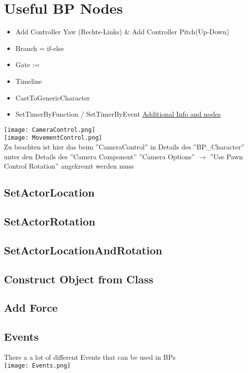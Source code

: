     \section{Useful BP Nodes}    
        \begin{itemize}
            \item Add Controller Yaw (Rechts-Links) \& Add Controller Pitch(Up-Down) 
            \item Branch = if-else
            \item Gate := 
            \item Timeline
            \item CastToGenericCharacter
            \item SetTimerByFunction / SetTimerByEvent \href{https://docs.unrealengine.com/en-US/Gameplay/HowTo/UseTimers/Blueprints/index.html}{Additional Info and nodes}
        \end{itemize}
        \texttt{[image: CameraControl.png]} \\
        \texttt{[image: MovementControl.png]} \\
        Zu beachten ist hier das beim ''CameraControl'' in Details des ''BP\_Character''
        unter den Details des ''Camera Component'' ''Camera Options'' $\rightarrow$ ''Use Pawn Control Rotation'' angekreuzt werden muss \\

        \subsection{SetActorLocation}
        \subsection{SetActorRotation}
        \subsection{SetActorLocationAndRotation}
        \subsection{Construct Object from Class}
        \subsection{Add Force}
        \subsection{Events}
            There a a lot of different Events that can be used in BPs \\
            \texttt{[image: Events.png]} \\
